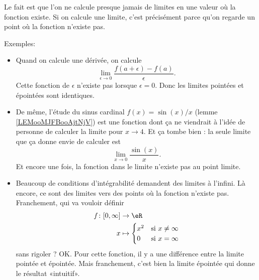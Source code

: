 Le fait est que l'on ne calcule presque jamais de limites en une valeur où la fonction existe. Si on calcule une limite, c'est précisément parce qu'on regarde un point où la fonction n'existe pas.

Exemples:
\begin{itemize}
	\item Quand on calcule une dérivée, on calcule
	      \begin{equation}
		      \lim_{\epsilon\to 0}\frac{ f(a+\epsilon)-f(a) }{ \epsilon }.
	      \end{equation}
	      Cette fonction de \( \epsilon\) n'existe pas lorsque \( \epsilon=0\). Donc les limites pointées et épointées sont identiques.
	\item
	      De même, l'étude du sinus cardinal \( f(x)=\sin(x)/x\) (lemme \ref{LEMooMJFBooAjtNjV}) est une fonction dont ça ne viendrait à l'idée de personne de calculer la limite pour \( x\to 4\). Et ça tombe bien : la seule limite que ça donne envie de calculer est
	      \begin{equation}
		      \lim_{x\to 0} \frac{ \sin(x) }{ x }.
	      \end{equation}
	      Et encore une fois, la fonction dans le limite n'existe pas au point limite.
	\item
	      Beaucoup de conditions d'intégrabilité demandent des limites à l'infini. Là encore, ce sont des limites vers des points où la fonction n'existe pas. Franchement, qui va vouloir définir
	      \begin{equation}
		      \begin{aligned}
			      f\colon \mathopen[ 0 , \infty \mathclose] & \to \eR                               \\
			      x                                         & \mapsto \begin{cases}
				                                                          x^2 & \text{si } x\neq \infty \\
				                                                          0   & \text{si } x=\infty
			                                                          \end{cases}
		      \end{aligned}
	      \end{equation}
	      sans rigoler ?  OK. Pour cette fonction, il y a une différence entre la limite pointée et épointée. Mais franchement, c'est bien la limite épointée qui donne le résultat «intuitif».
\end{itemize}

